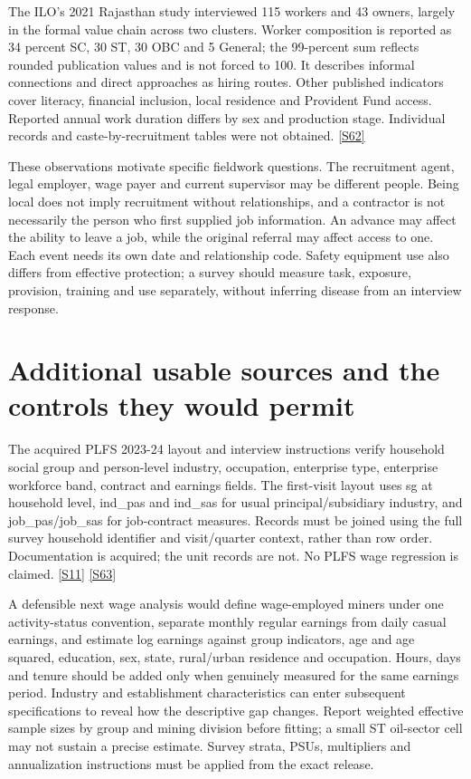 \documentclass[11pt,a4paper]{report}
\begin{document}
The ILO's 2021 Rajasthan study interviewed 115 workers and 43 owners, largely in the formal value chain across two clusters. Worker composition is reported as 34 percent SC, 30 ST, 30 OBC and 5 General; the 99-percent sum reflects rounded publication values and is not forced to 100. It describes informal connections and direct approaches as hiring routes. Other published indicators cover literacy, financial inclusion, local residence and Provident Fund access. Reported annual work duration differs by sex and production stage. Individual records and caste-by-recruitment tables were not obtained. \hyperlink{S62}{[S62]}

These observations motivate specific fieldwork questions. The recruitment agent, legal employer, wage payer and current supervisor may be different people. Being local does not imply recruitment without relationships, and a contractor is not necessarily the person who first supplied job information. An advance may affect the ability to leave a job, while the original referral may affect access to one. Each event needs its own date and relationship code. Safety equipment use also differs from effective protection; a survey should measure task, exposure, provision, training and use separately, without inferring disease from an interview response.

\section{Additional usable sources and the controls they would permit}
The acquired PLFS 2023-24 layout and interview instructions verify household social group and person-level industry, occupation, enterprise type, enterprise workforce band, contract and earnings fields. The first-visit layout uses sg at household level, ind\_pas and ind\_sas for usual principal/\allowbreak{}subsidiary industry, and job\_pas/\allowbreak{}job\_sas for job-contract measures. Records must be joined using the full survey household identifier and visit/\allowbreak{}quarter context, rather than row order. Documentation is acquired; the unit records are not. No PLFS wage regression is claimed. \hyperlink{S11}{[S11]} \hyperlink{S63}{[S63]}

A defensible next wage analysis would define wage-employed miners under one activity-status convention, separate monthly regular earnings from daily casual earnings, and estimate log earnings against group indicators, age and age squared, education, sex, state, rural/\allowbreak{}urban residence and occupation. Hours, days and tenure should be added only when genuinely measured for the same earnings period. Industry and establishment characteristics can enter subsequent specifications to reveal how the descriptive gap changes. Report weighted effective sample sizes by group and mining division before fitting; a small ST oil-sector cell may not sustain a precise estimate. Survey strata, PSUs, multipliers and annualization instructions must be applied from the exact release.
\end{document}
